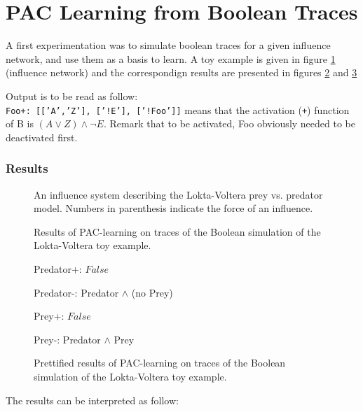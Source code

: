 \documentclass{llncs}
\begin{document}
\section{PAC Learning from Boolean Traces}

A first experimentation was to simulate boolean traces for a given influence network, and use them as a basis to learn. A toy example is given in figure \ref{bool-LV} (influence network) and the correspondign results are presented in figures \ref{bool-LV.res} and \ref{bool-LV.res.pretty}

Output is to be read as follow:\\
\texttt{Foo+:~[['A','Z'],~['!E'],~['!Foo']]} means that the activation (\texttt{+}) function of B is $(A \vee Z)\wedge\neg E$. Remark that to be activated, Foo obviously needed to be deactivated first.

\subsubsection{Results}

\begin{figure}[htp]
	
	\vspace{-1em}
	\caption{An influence system describing the Lokta-Voltera prey vs. predator model. Numbers in parenthesis indicate the force of an influence. \label{bool-LV}}
\end{figure}
\begin{figure}[htp]
	
	\vspace{-1em}
	\caption{Results of PAC-learning on traces of the Boolean simulation of the Lokta-Voltera toy example.\label{bool-LV.res}}
\end{figure}
\begin{figure}[htp]
	\ttfamily
	Predator+: $False$
	
	Predator-: Predator $\wedge$ (no Prey)
	
	Prey+: $False$
	
	Prey-: Predator $\wedge$ Prey
	\rmfamily
	\caption{Prettified results of PAC-learning on traces of the Boolean simulation of the Lokta-Voltera toy example.\label{bool-LV.res.pretty}}
\end{figure}
\pagebreak
The results can be interpreted as follow:
\end{document}
